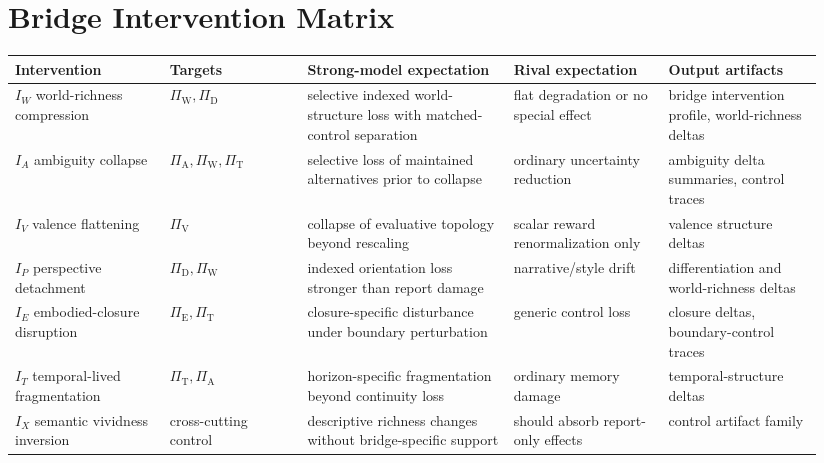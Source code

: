 \documentclass[11pt,a4paper]{article}
\theoremstyle{definition}
\newcommand{\PiD}{\Pi_{\mathrm{D}}}
\newcommand{\PiV}{\Pi_{\mathrm{V}}}
\newcommand{\PiW}{\Pi_{\mathrm{W}}}
\newcommand{\PiA}{\Pi_{\mathrm{A}}}
\newcommand{\PiE}{\Pi_{\mathrm{E}}}
\newcommand{\PiT}{\Pi_{\mathrm{T}}}
\begin{document}
\section{Bridge Intervention Matrix}
\begin{center}
\small
\begin{tabularx}{\linewidth}{@{}p{0.18\linewidth}p{0.16\linewidth}p{0.24\linewidth}p{0.18\linewidth}p{0.18\linewidth}@{}}
\toprule
Intervention & Targets & Strong-model expectation & Rival expectation & Output artifacts \\
\midrule
$I_W$ world-richness compression & $\PiW,\PiD$ & selective indexed world-structure loss with matched-control separation & flat degradation or no special effect & bridge intervention profile, world-richness deltas \\
$I_A$ ambiguity collapse & $\PiA,\PiW,\PiT$ & selective loss of maintained alternatives prior to collapse & ordinary uncertainty reduction & ambiguity delta summaries, control traces \\
$I_V$ valence flattening & $\PiV$ & collapse of evaluative topology beyond rescaling & scalar reward renormalization only & valence structure deltas \\
$I_P$ perspective detachment & $\PiD,\PiW$ & indexed orientation loss stronger than report damage & narrative/style drift & differentiation and world-richness deltas \\
$I_E$ embodied-closure disruption & $\PiE,\PiT$ & closure-specific disturbance under boundary perturbation & generic control loss & closure deltas, boundary-control traces \\
$I_T$ temporal-lived fragmentation & $\PiT,\PiA$ & horizon-specific fragmentation beyond continuity loss & ordinary memory damage & temporal-structure deltas \\
$I_X$ semantic vividness inversion & cross-cutting control & descriptive richness changes without bridge-specific support & should absorb report-only effects & control artifact family \\
\bottomrule
\end{tabularx}
\end{center}
\end{document}
